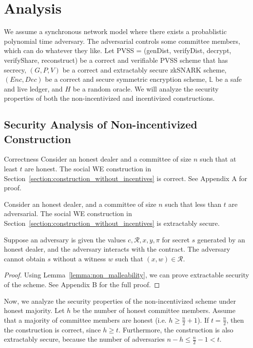 \section{Analysis}
We assume a synchronous network model where there exists a probablistic polynomial time adversary.
The adversarial controls some committee members, which can do whatever they like.
Let \textsf{PVSS} = (\textsf{genDist}, \textsf{verifyDist}, \textsf{decrypt}, \textsf{verifyShare}, \textsf{reconstruct}) be a correct and verifiable PVSS scheme that has secrecy,
$(G, P, V)$ be a correct and extractably secure zkSNARK scheme, $(Enc, Dec)$ be a correct and secure symmetric encryption scheme,
$\mathbb{L}$ be a safe and live ledger, and $H$ be a random oracle.
We will analyze the security properties of both the non-incentivized and incentivized constructions.

\subsection{Security Analysis of Non-incentivized Construction}
\begin{theorem}{Correctness}\label{thm:correctness_hm}
    Consider an honest dealer and a committee of size $n$ such that at least $t$ are honest.
    The social WE construction in Section~\ref{section:construction_without_incentives} is correct.
    See Appendix A for proof.
\end{theorem}

\begin{theorem}\label{thm:security_hm}
    Consider an honest dealer, and a committee of size $n$ such that less than $t$ are adversarial.
    The social WE construction in Section~\ref{section:construction_without_incentives} is extractably secure.
\end{theorem}
\begin{lemma}\label{lemma:non_malleability}
    Suppose an adversary is given the values $c, \mathcal{R}, x, y, \pi$ for secret $s$ generated by an honest dealer, and the adversary interacts with the contract.
    The adversary cannot obtain $s$ without a witness $w$ such that $(x, w) \in \mathcal{R}$.
\end{lemma}
\begin{proof}
    Using Lemma~\ref{lemma:non_malleability}, we can prove extractable security of the scheme.
    See Appendix B for the full proof.
\end{proof}

Now, we analyze the security properties of the non-incentivized scheme under honest majority.
Let $h$ be the number of honest committee members.
Assume that a majority of committee members are honest (i.e. $h \geq \frac{n}{2} + 1$).
If $t = \frac{n}{2}$, then the construction is correct, since $h \geq t$.
Furthermore, the construction is also extractably secure, because the number of adversaries $n - h \leq \frac{n}{2} - 1 < t$.

